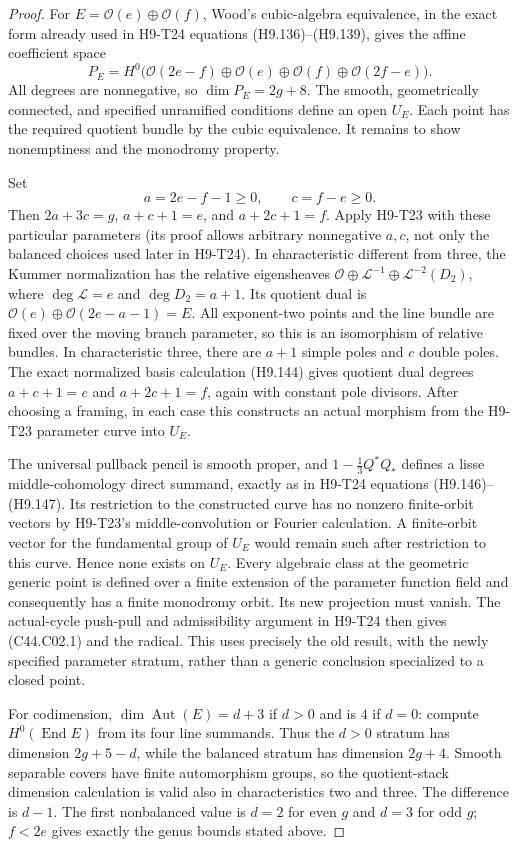 \documentclass[11pt]{article}
\theoremstyle{remark}\newtheorem{remark}[theorem]{Remark}
\DeclareMathOperator{\End}{End}
\begin{document}
\begin{proof}
For $E=\mathcal O(e)\oplus\mathcal O(f)$, Wood's cubic-algebra
equivalence, in the exact form already used in H9-T24 equations
(H9.136)--(H9.139), gives the affine coefficient space
\[
 P_E=H^0\bigl(\mathcal O(2e-f)\oplus\mathcal O(e)
                \oplus\mathcal O(f)\oplus\mathcal O(2f-e)\bigr).
\]
All degrees are nonnegative, so $\dim P_E=2g+8$. The smooth,
geometrically connected, and specified unramified conditions define an
open $U_E$. Each point has the required quotient bundle by the cubic
equivalence. It remains to show nonemptiness and the monodromy property.

Set
\[
             a=2e-f-1\ge0,\qquad c=f-e\ge0.
\]
Then $2a+3c=g$, $a+c+1=e$, and $a+2c+1=f$. Apply H9-T23 with
these particular parameters (its proof allows arbitrary nonnegative
$a,c$, not only the balanced choices used later in H9-T24).
In characteristic different from three, the Kummer normalization has
the relative eigensheaves
$\mathcal O\oplus\mathcal L^{-1}\oplus\mathcal L^{-2}(D_2)$,
where $\deg\mathcal L=e$ and $\deg D_2=a+1$. Its quotient dual is
$\mathcal O(e)\oplus\mathcal O(2e-a-1)=E$.
All exponent-two points and the line bundle are fixed over the moving
branch parameter, so this is an isomorphism of relative bundles.
In characteristic three, there are $a+1$ simple poles and $c$ double
poles. The exact normalized basis calculation (H9.144) gives quotient
dual degrees $a+c+1=e$ and $a+2c+1=f$, again with constant pole
divisors. After choosing a framing, in each case this constructs an
actual morphism from the H9-T23 parameter curve into $U_E$.

The universal pullback pencil is smooth proper, and
$1-\frac13Q^*Q_*$ defines a lisse middle-cohomology direct summand,
exactly as in H9-T24 equations (H9.146)--(H9.147). Its restriction to
the constructed curve has no nonzero finite-orbit vectors by H9-T23's
middle-convolution or Fourier calculation. A finite-orbit vector for
the fundamental group of $U_E$ would remain such after restriction to
this curve. Hence none exists on $U_E$. Every algebraic class at the
geometric generic point is defined over a finite extension of the
parameter function field and consequently has a finite monodromy
orbit. Its new projection must vanish. The actual-cycle push-pull and
admissibility argument in H9-T24 then gives (C44.C02.1) and the radical.
This uses precisely the old result, with the newly specified parameter
stratum, rather than a generic conclusion specialized to a closed point.

For codimension, $\dim\operatorname{Aut}(E)=d+3$ if $d>0$ and is
$4$ if $d=0$: compute $H^0(\End E)$ from its four line summands.
Thus the $d>0$ stratum has dimension $2g+5-d$, while the balanced
stratum has dimension $2g+4$. Smooth separable covers have finite
automorphism groups, so the quotient-stack dimension calculation is
valid also in characteristics two and three. The difference is $d-1$.
The first nonbalanced value is $d=2$ for even $g$ and $d=3$ for odd
$g$; $f<2e$ gives exactly the genus bounds stated above.
\end{proof}
\end{document}

